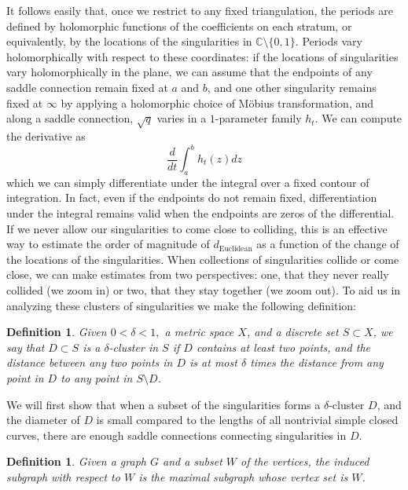 \documentclass[12pt]{article}
\newtheorem{definition}[theorem]{Definition}
\newcommand{\cc}{\mathbb{C}}
\begin{document}
\noindent It follows easily that, once we restrict to any fixed triangulation, the periods are defined by holomorphic functions of the coefficients on each stratum, or equivalently, by the locations of the singularities in $\cc \setminus \{0,1\}$. Periods vary holomorphically with respect to these coordinates: if the locations of singularities vary holomorphically in the plane, we can assume that the endpoints of any saddle connection remain fixed at $a$ and $b$, and one other singularity remains fixed at $\infty$ by applying a holomorphic choice of M\"obius transformation, and along a saddle connection, $\sqrt{q}$ varies in a $1$-parameter family $h_t$. We can compute the derivative as $$\frac{d}{dt}\int_{a}^b h_t(z)dz$$ which we can simply differentiate under the integral over a fixed contour of integration. In fact, even if the endpoints do not remain fixed, differentiation under the integral remains valid when the endpoints are zeros of the differential. If we never allow our singularities to come close to colliding, this is an effective way to estimate the order of magnitude of $d_\mathrm{Euclidean}$ as a function of the change of the locations of the singularities. When collections of singularities collide or come close, we can make estimates from two perspectives: one, that they never really collided (we zoom in) or two, that they stay together (we zoom out). To aid us in analyzing these clusters of singularities we make the following definition:

\begin{definition}Given $0 < \delta < 1,$ a metric space $X$, and a discrete set $S \subset X$, we say that $D \subset S$ is a \emph{$\delta$-cluster} in $S$ if $D$ contains at least two points, and the distance between any two points in $D$ is at most $\delta$ times the distance from any point in $D$ to any point in $S \setminus D$. \end{definition}

\noindent We will first show that when a subset of the singularities forms a $\delta$-cluster $D$, and the diameter of $D$ is small compared to the lengths of all nontrivial simple closed curves, there are enough saddle connections connecting singularities in $D$.

\begin{definition}Given a graph $G$ and a subset $W$ of the vertices, the \emph{induced} subgraph with respect to $W$ is the maximal subgraph whose vertex set is $W$.\end{definition}
\end{document}
